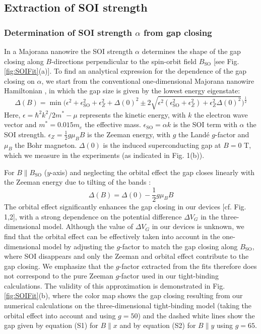 \subsection{Extraction of SOI strength}
\subsubsection{Determination of SOI strength $\alpha$ from gap closing}
In a Majorana nanowire the SOI strength $\alpha$ determines the shape of the gap closing along $B$-directions perpendicular to the spin-orbit field $B_{\mathrm{SO}}$ \cite{VanHeck,Pan2018} [see Fig. \ref{fig:SOIFit}(a)]. To find an analytical expression for the dependence of the gap closing on $\alpha$, we start from the conventional one-dimensional Majorana nanowire Hamiltonian \cite{Lutchyn2010,Oreg2010}, in which the gap size is given by the lowest energy eigenstate:
\begin{equation}
\Delta(B) = \min \bigg( \epsilon^2 + \epsilon_{\mathrm{SO}}^2 + \epsilon_{Z}^2 + \Delta(0)^2 \pm 2 \sqrt{\epsilon^2 ( \epsilon_{\mathrm{SO}}^2+\epsilon_{Z}^2 ) + \epsilon_{Z}^2\Delta(0)^2} \bigg)^\frac{1}{2}
\end{equation}
Here, $\epsilon=\hbar^2k^2/2m^*-\mu$ represents the kinetic energy, with $k$ the electron wave vector and $m^*=0.015 m_e$ the effective mass. $\epsilon_{\mathrm{SO}}=\alpha k$ is the SOI term with $\alpha$ the SOI strength. $\epsilon_Z = \frac{1}{2}g\mu_BB$ is the Zeeman energy, with $g$ the Land\'e $g$-factor and $\mu_B$ the Bohr magneton. $\Delta(0)$ is the induced superconducting gap at $B = 0$ T, which we measure in the experiments (as indicated in Fig. 1(b)).

For $B \parallel B_{\mathrm{SO}}$ ($y$-axis) and neglecting the orbital effect the gap closes linearly with the Zeeman energy due to tilting of the bands \cite{Osca2014,Rex2014}: 
\begin{equation}
\Delta(B) = \Delta(0) - \frac{1}{2}g\mu_BB
\end{equation}
The orbital effect significantly enhances the gap closing in our devices [cf. Fig. 1,2], with a  strong dependence on the potential difference $\Delta V_G$ in the three-dimensional model. Although the value of $\Delta V_G$ in our devices is unknown, we find that the orbital effect can be effectively taken into account in the one-dimensional model by adjusting the $g$-factor to match the gap closing along $B_{\mathrm{SO}}$, where SOI disappears and only the Zeeman and orbital effect contribute to the gap closing. We emphasize that the $g$-factor extracted from the fits therefore does not correspond to the pure Zeeman $g$-factor used in our tight-binding calculations. The validity of this approximation is demonstrated in Fig. \ref{fig:SOIFit}(b), where the color map shows the gap closing resulting from our numerical calculations on the three-dimensional tight-binding model (taking the orbital effect into account and using $g = 50$) and the dashed white lines show the gap given by equation (S1) for $B\parallel x$ and by equation (S2) for $B\parallel y$ using $g=65$.

